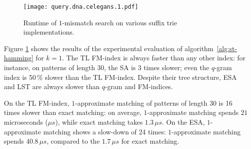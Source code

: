 \begin{figure}[hb]
\begin{center}
\caption[$k$-Mismatches runtime]{Runtime of $1$-mismatch search on various suffix trie implementations.}
\label{fig:query-dna-apx}
\texttt{[image: query.dna.celegans.1.pdf]}
\end{center}
\end{figure}


%

Figure \ref{fig:query-dna-apx} shows the results of the experimental evaluation of algorithm~\ref{alg:st-hamming} for $k=1$.
The TL FM-index is always faster than any other index: for instance, on patterns of length 30, the SA is 3 times slower; even the $q$-gram index is 50\,\% slower than the TL FM-index.
Despite their tree structure, ESA and LST are always slower than $q$-gram and FM-indices.

On the TL FM-index, $1$-approximate matching of patterns of length 30 is 16 times slower than exact matching: on average, $1$-approximate matching spends $21$ microseconds ($\mu s$), while exact matching takes $1.3 \, \mu s$.
On the ESA, $1$-approximate matching shows a slow-down of 24 times: $1$-approximate matching spends $40.8 \, \mu s$, compared to the $1.7 \, \mu s$ for exact matching.

